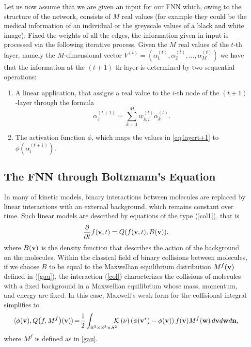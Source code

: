 \documentclass{article}
\newcommand{\bv}{\mathrm{BV}}
\newcommand{\fer}[1]{(\ref{#1})}
\newcommand{\R}{\mathbb R}
\def\R{\mathbb{R}}
\def\bv{{\bf v}}
\def\bw{{\bf w}}
\begin{document}
% 
Let us now assume that we are given an input for our FNN which, owing to the structure of the network, consists of $M$ real values (for example they could be the medical information of an individual or the greyscale values of a black and white image).
% 
Fixed the weights of all the edges, the information given in input is processed via the following iterative process.
% 
Given the $M$ real values of the $t$-th layer, namely the $M$-dimensional vector $V^{(t)}=(\alpha_1^{(t)},\alpha_2^{(t)},\dots,\alpha_{M}^{(t)})$ we have that the information at the $(t+1)$-th layer is determined by two sequential operations:
% 
\begin{enumerate}
    \item[(O1)] \label{first:op:FNN} A linear application, that assigns a real value to the $i$-th node of the $(t+1)$-layer through the formula
    \begin{equation}
    \label{eq:layert+1}
        \alpha_{i}^{(t+1)}=\sum_{k=1}^M w_{k,i}^{(t)}\alpha_{k}^{(t)}.
    \end{equation}
    \item[(O2)] \label{second:op:FNN} The activation function $\phi$, which maps the values in \eqref{eq:layert+1} to $\phi(\alpha_{i}^{(t+1)})$.
\end{enumerate}
% 



\subsection{The FNN through Boltzmann's Equation}
% 

In many of kinetic models, binary interactions between molecules are replaced by linear interactions with an external background, which remains constant over time. 
% 
Such linear models are described by equations of the type \fer{col1}, that is
% 
\begin{equation}
    \label{col-hom}
    \frac\partial{\partial t}f(\bv,t) = Q(f(\bv,t), B(\bv)),    
\end{equation}
% 
where $B(\bv)$ is the density function that describes the action of the background on the molecules. 
% 
Within the classical field of binary collisions between molecules, if we choose $B$ to be equal to the Maxwellian equilibrium distribution $M^f(\bv)$ defined in \fer{gau}, the interaction \fer{col} characterizes the collisions of molecules with a fixed background in a Maxwellian equilibrium whose mass, momentum, and energy are fixed.
% 
In this case, Maxwell’s weak form for the collisional integral simplifies to 
\begin{equation}
    \label{weak-lin}
    \langle \phi(\bv), Q\bigl(f,M^f\bigr)(\bv)\rangle \! =\! \frac 12 \int_{{\R}^3\times\R^3\times{S^2}} \!\!\!\!\mathcal{K}\left(\nu\right) 
    \left(\phi(\bv^*) - \phi(\bv)\right)f( \bv)M^f( \bw)\, d\bv d \bw d{\bf n},
\end{equation}
where $M^f$ is defined as in \eqref{gau}.
\end{document}
